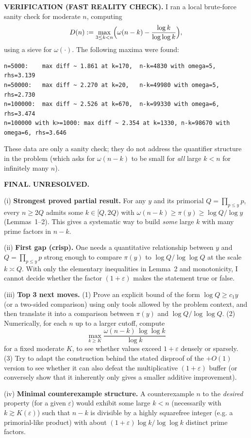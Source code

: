 \textbf{VERIFICATION (FAST REALITY CHECK).}
I ran a local brute-force sanity check for moderate $n$, computing
\[D(n):=\max_{3\le k<n}\Bigl(\omega(n-k)-\frac{\log k}{\log\log k}\Bigr),\]
using a sieve for $\omega(\cdot)$. The following maxima were found:
\begin{verbatim}
n=5000:    max diff ~ 1.861 at k=170,  n-k=4830 with omega=5, rhs=3.139
n=50000:   max diff ~ 2.270 at k=20,   n-k=49980 with omega=5, rhs=2.730
n=100000:  max diff ~ 2.526 at k=670,  n-k=99330 with omega=6, rhs=3.474
n=100000 with k>=1000: max diff ~ 2.354 at k=1330, n-k=98670 with omega=6, rhs=3.646
\end{verbatim}
These data are only a sanity check; they do not address the quantifier structure in the problem (which asks for $\omega(n-k)$ to be small for \emph{all} large $k<n$ for infinitely many $n$).

\textbf{FINAL.}
\textbf{UNRESOLVED.}

(i) \textbf{Strongest proved partial result.}
For any $y$ and its primorial $Q=\prod_{p\le y}p$, every $n\ge 2Q$ admits some $k\in[Q,2Q)$ with $\omega(n-k)\ge\pi(y)\ge \log Q/\log y$ (Lemmas~1--2). This gives a systematic way to build \emph{some} large $k$ with many prime factors in $n-k$.

(ii) \textbf{First gap (crisp).}
One needs a quantitative relationship between $y$ and $Q=\prod_{p\le y}p$ strong enough to compare $\pi(y)$ to $\log Q/\log\log Q$ at the scale $k\asymp Q$. With only the elementary inequalities in Lemma~2 and monotonicity, I cannot decide whether the factor $(1+\varepsilon)$ makes the statement true or false.

(iii) \textbf{Top 3 next moves.}
(1) Prove an explicit bound of the form $\log Q\ge c_1 y$ (or a two-sided comparison) using only tools allowed by the problem context, and then translate it into a comparison between $\pi(y)$ and $\log Q/\log\log Q$.
(2) Numerically, for each $n$ up to a larger cutoff, compute
\[\max_{k\ge K} \frac{\omega(n-k)\,\log\log k}{\log k}
\]
for a fixed moderate $K$, to see whether values exceed $1+\varepsilon$ densely or sparsely.
(3) Try to adapt the construction behind the stated disproof of the $+O(1)$ version to see whether it can also defeat the multiplicative $(1+\varepsilon)$ buffer (or conversely show that it inherently only gives a smaller additive improvement).

(iv) \textbf{Minimal counterexample structure.}
A counterexample $n$ to the \emph{desired} property (for a given $\varepsilon$) would exhibit some large $k<n$ (necessarily with $k\gtrsim K(\varepsilon)$) such that $n-k$ is divisible by a highly squarefree integer (e.g. a primorial-like product) with about $(1+\varepsilon)\log k/\log\log k$ distinct prime factors.




